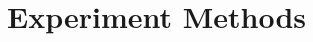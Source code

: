 \documentclass[conference]{IEEEtran}
\begin{document}

%




\section{Experiment Methods}
\end{document}
